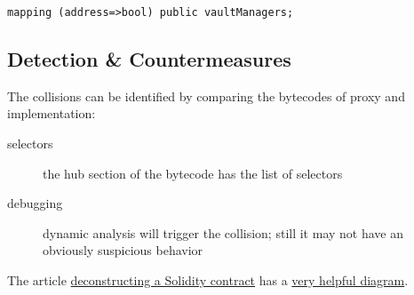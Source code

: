 \begin{lstlisting}[language=Solidity]
mapping (address=>bool) public vaultManagers;
\end{lstlisting}

\subsection{Detection \& Countermeasures}

The collisions can be identified by comparing the bytecodes of proxy and implementation:

\begin{description}
\item[selectors]{the hub section of the bytecode has the list of selectors}
\item[debugging]{dynamic analysis will trigger the collision; still it may not have an obviously suspicious behavior}
\end{description}

The article \href{\urlarticledeconstructingcontract}{deconstructing a Solidity contract} has a \href{\urldiagrambytecode}{very helpful diagram}.
